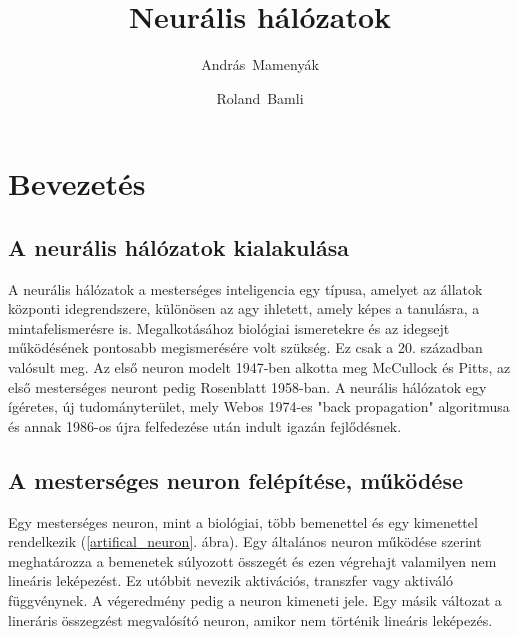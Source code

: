 \documentclass[a4paper]{article}
\author[1]{András~Mamenyák}
\author[1]{Roland~Bamli}
\affil[1]{Mérnök informatikus (BSc) szakos hallgató, Debreceni Egyetem}
\title{Neurális hálózatok}
\begin{document}
\maketitle

\section{Bevezetés}
\subsection{A neurális hálózatok kialakulása}
A neurális hálózatok a mesterséges inteligencia egy típusa, amelyet az állatok központi idegrendszere, különösen az agy ihletett, amely képes a tanulásra, a mintafelismerésre is. Megalkotásához biológiai ismeretekre és az idegsejt működésének pontosabb megismerésére volt szükség. Ez csak a 20. században valósult meg. Az első neuron modelt 1947-ben alkotta meg McCullock és Pitts, az első mesterséges neuront pedig Rosenblatt 1958-ban. A neurális hálózatok egy ígéretes, új tudományterület, mely Webos 1974-es "back propagation" algoritmusa és annak 1986-os újra felfedezése után indult igazán fejlődésnek.




\subsection{A mesterséges neuron felépítése, működése}
Egy mesterséges neuron, mint a biológiai, több bemenettel és egy kimenettel rendelkezik (\ref{artifical_neuron}. ábra). Egy általános neuron működése szerint  meghatározza a bemenetek súlyozott összegét és ezen végrehajt valamilyen nem lineáris leképezést. Ez utóbbit nevezik aktivációs, transzfer vagy aktiváló függvénynek. A végeredmény pedig a neuron kimeneti jele. Egy másik változat a lineráris összegzést megvalósító neuron, amikor nem történik lineáris leképezés.
\end{document}
